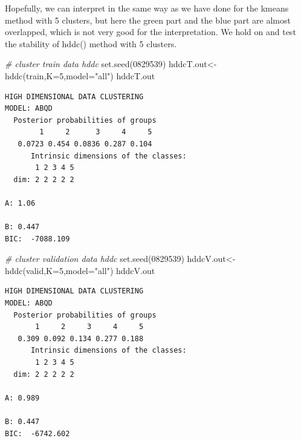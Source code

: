 \documentclass[
  11pt,
]{article}
\newenvironment{Shaded}{\begin{snugshade}}{\end{snugshade}}
\newcommand{\AttributeTok}[1]{\textcolor[rgb]{0.77,0.63,0.00}{#1}}
\newcommand{\CommentTok}[1]{\textcolor[rgb]{0.56,0.35,0.01}{\textit{#1}}}
\newcommand{\DecValTok}[1]{\textcolor[rgb]{0.00,0.00,0.81}{#1}}
\newcommand{\FunctionTok}[1]{\textcolor[rgb]{0.00,0.00,0.00}{#1}}
\newcommand{\NormalTok}[1]{#1}
\newcommand{\OtherTok}[1]{\textcolor[rgb]{0.56,0.35,0.01}{#1}}
\newcommand{\SpecialCharTok}[1]{\textcolor[rgb]{0.00,0.00,0.00}{#1}}
\newcommand{\StringTok}[1]{\textcolor[rgb]{0.31,0.60,0.02}{#1}}
\begin{document}
Hopefully, we can interpret in the same way as we have done for the kmeans method with 5 clusters, but here the green part and the blue part are almost overlapped, which is not very good for the interpretation. We hold on and test the stability of hddc() method with 5 clusters.

\begin{Shaded}
\begin{Highlighting}[]
\CommentTok{\# cluster train data hddc}
\FunctionTok{set.seed}\NormalTok{(}\DecValTok{0829539}\NormalTok{)}
\NormalTok{hddcT.out}\OtherTok{\textless{}{-}}\FunctionTok{hddc}\NormalTok{(train,}\AttributeTok{K=}\DecValTok{5}\NormalTok{,}\AttributeTok{model=}\StringTok{"all"}\NormalTok{)}
\NormalTok{hddcT.out}
\end{Highlighting}
\end{Shaded}

\begin{verbatim}
HIGH DIMENSIONAL DATA CLUSTERING
MODEL: ABQD
  Posterior probabilities of groups
        1     2      3     4     5
   0.0723 0.454 0.0836 0.287 0.104
      Intrinsic dimensions of the classes:
       1 2 3 4 5
  dim: 2 2 2 2 2
       
A: 1.06
        
B: 0.447
BIC:  -7088.109 
\end{verbatim}

\begin{Shaded}
\begin{Highlighting}[]
\CommentTok{\# cluster validation data hddc}
\FunctionTok{set.seed}\NormalTok{(}\DecValTok{0829539}\NormalTok{)}
\NormalTok{hddcV.out}\OtherTok{\textless{}{-}}\FunctionTok{hddc}\NormalTok{(valid,}\AttributeTok{K=}\DecValTok{5}\NormalTok{,}\AttributeTok{model=}\StringTok{"all"}\NormalTok{)}
\NormalTok{hddcV.out}
\end{Highlighting}
\end{Shaded}

\begin{verbatim}
HIGH DIMENSIONAL DATA CLUSTERING
MODEL: ABQD
  Posterior probabilities of groups
       1     2     3     4     5
   0.309 0.092 0.134 0.277 0.188
      Intrinsic dimensions of the classes:
       1 2 3 4 5
  dim: 2 2 2 2 2
        
A: 0.989
        
B: 0.447
BIC:  -6742.602 
\end{verbatim}

\begin{Shaded}
\end{Shaded}
\end{document}
